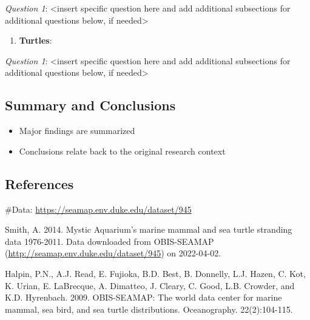 \documentclass[
  12pt,
]{article}
\providecommand{\tightlist}{%
  \setlength{\itemsep}{0pt}\setlength{\parskip}{0pt}}
\begin{document}
\emph{Question 1}: \textless insert specific question here and add
additional subsections for additional questions below, if
needed\textgreater{}

\begin{enumerate}
\def\labelenumi{\arabic{enumi}.}
\setcounter{enumi}{2}
\tightlist
\item
  \textbf{Turtles}:
\end{enumerate}

\emph{Question 1}: \textless insert specific question here and add
additional subsections for additional questions below, if
needed\textgreater{}

\newpage

\hypertarget{summary-and-conclusions}{%
\subsection{Summary and Conclusions}\label{summary-and-conclusions}}

\begin{itemize}
\tightlist
\item
  Major findings are summarized
\item
  Conclusions relate back to the original research context
\end{itemize}

\newpage

\hypertarget{references}{%
\subsection{References}\label{references}}

\#Data: \url{https://seamap.env.duke.edu/dataset/945}

Smith, A. 2014. Mystic Aquarium's marine mammal and sea turtle stranding
data 1976-2011. Data downloaded from OBIS-SEAMAP
(\url{http://seamap.env.duke.edu/dataset/945}) on 2022-04-02.

Halpin, P.N., A.J. Read, E. Fujioka, B.D. Best, B. Donnelly, L.J. Hazen,
C. Kot, K. Urian, E. LaBrecque, A. Dimatteo, J. Cleary, C. Good, L.B.
Crowder, and K.D. Hyrenbach. 2009. OBIS-SEAMAP: The world data center
for marine mammal, sea bird, and sea turtle distributions. Oceanography.
22(2):104-115.
\end{document}

